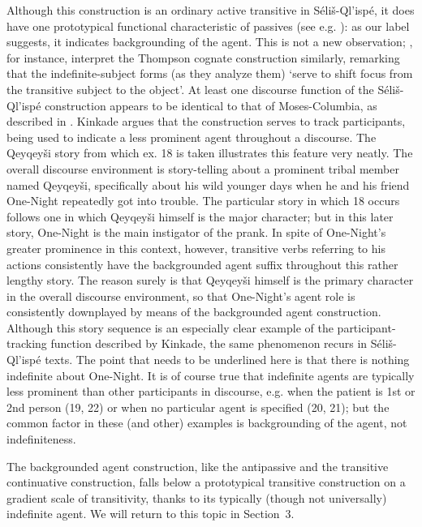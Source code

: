 \documentclass[output=paper,colorlinks,citecolor=brown]{langscibook}
\begin{document}
Although this construction is an ordinary active transitive in
S\'eli\v{s}-Ql'isp\'e, it does have one prototypical functional
characteristic of passives (see e.g. \newline\cite{Shibatani:1985}): as our label
suggests, it indicates backgrounding of the agent.  This is not a new
observation; \cite[58]{Thompson&Thompson:1992}, for instance, interpret
the Thompson cognate construction similarly, remarking that the\newline
indefinite-subject forms (as they analyze them) `serve to shift focus
from the transitive subject to the object'.  At least one discourse
function of the S\'eli\v{s}-Ql'isp\'e construction appears to be
identical to that of Moses-Columbia, as described in \cite{Kinkade:1989}.
Kinkade argues that the construction serves to track participants,
being used to indicate a less prominent agent throughout a discourse.
The Qeyqey\v{s}i story from which ex.  18 is taken illustrates this
feature very neatly.  The overall discourse environment is
story-telling about a prominent tribal member named Qeyqey\v{s}i,
specifically about his wild younger days when he and his friend
One-Night repeatedly got into trouble.  The particular story in which
18 occurs follows one in which Qeyqey\v{s}i himself is the major
character; but in this later story, One-Night is the main instigator
of the prank.  In spite of One-Night's greater prominence in this
context, however, transitive verbs referring to his actions
consistently have the backgrounded agent suffix throughout this rather
lengthy story.  The reason surely is that Qeyqey\v{s}i himself is the
primary character in the overall discourse environment, so that
One-Night's agent role is consistently downplayed by means of the
backgrounded agent construction.  Although this story sequence is an
especially clear example of the participant-tracking function
described by Kinkade, the same phenomenon recurs in
S\'eli\v{s}-Ql'isp\'e texts.  The point that needs to be underlined
here is that there is nothing indefinite about One-Night.  It is of
course true that indefinite agents are typically less prominent than
other participants in discourse, e.g.  when the patient is 1st or 2nd
person (19, 22) or when no particular agent is specified (20, 21); but
the common factor in these (and other) examples is backgrounding of
the agent, not indefiniteness.

The backgrounded agent construction, like the antipassive and the
transitive continuative construction, falls below a prototypical
transitive construction on a gradient scale of transitivity, thanks to
its typically (though not universally) indefinite agent.  We will
return to this topic in Section~3.
\end{document}
